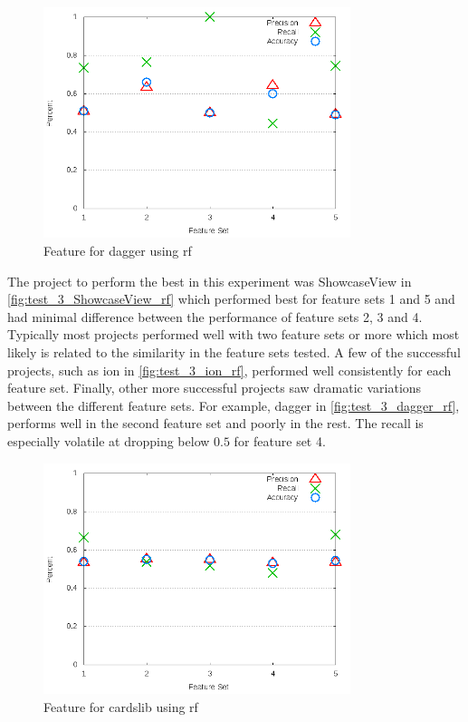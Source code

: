 \begin{figure}[!ht]
    \centering
        \includegraphics[width=0.8\textwidth]{images/rf/test_3/dagger_sample_range}
        \caption{Feature for dagger using \gls{rf}}
        \label{fig:test_3_dagger_rf}
\end{figure}

The project to perform the best in this experiment was ShowcaseView in \autoref{fig:test_3_ShowcaseView_rf} which performed best for feature sets 1 and 5 and had minimal difference between the performance of feature sets 2, 3 and 4. Typically most projects performed well with two feature sets or more which most likely is related to the similarity in the feature sets tested. A few of the successful projects, such as ion in \autoref{fig:test_3_ion_rf}, performed well consistently for each feature set. Finally, other more successful projects saw dramatic variations between the different feature sets. For example, dagger in \autoref{fig:test_3_dagger_rf}, performs well in the second feature set and poorly in the rest. The recall is especially volatile at dropping below $0.5$ for feature set 4. 


\begin{figure}[!ht]
    \centering
        \includegraphics[width=0.8\textwidth]{images/rf/test_3/cardslib_sample_range}
        \caption{Feature for cardslib using \gls{rf}}
        \label{fig:test_3_cardslib_rf}
\end{figure}

